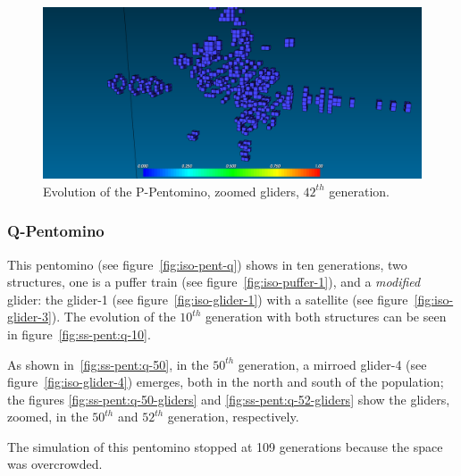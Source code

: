 \begin{figure}
	\centering
	\includegraphics[scale=0.3]{pentominoes_ss/p_42_gliders.png}
	\caption{Evolution of the P-Pentomino, zoomed gliders, $42^{th}$ generation.}
  \label{fig:ss-pent:p-42}
\end{figure}


\subsubsection{Q-Pentomino}
\label{sec:q-pentomino}
This pentomino (see figure~\ref{fig:iso-pent-q}) shows in ten generations, two
structures, one is a puffer train (see figure~\ref{fig:iso-puffer-1}), and a
\textit{modified} glider: the glider-1 (see figure~\ref{fig:iso-glider-1}) with
a satellite (see figure~\ref{fig:iso-glider-3}). The evolution of the $10^{th}$
generation with both structures can be seen in figure~\ref{fig:ss-pent:q-10}.

As shown in~\ref{fig:ss-pent:q-50}, in the $50^{th}$ generation, a mirroed
glider-4 (see figure~\ref{fig:iso-glider-4}) emerges, both in the north and
south of the population; the figures \ref{fig:ss-pent:q-50-gliders} and
\ref{fig:ss-pent:q-52-gliders} show the gliders, zoomed, in the $50^{th}$ and
$52^{th}$ generation, respectively.

The simulation of this pentomino stopped at 109 generations because the space
was overcrowded.

